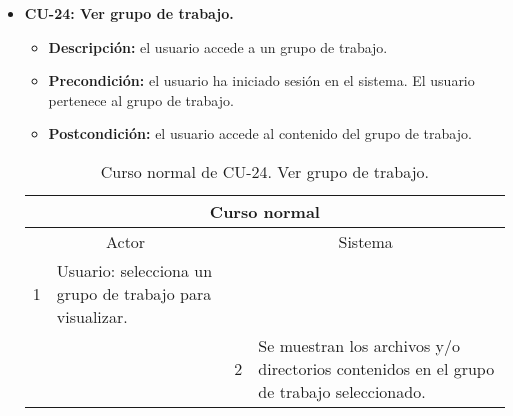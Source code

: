 \begin{itemize}
	\item \textbf{CU-24: Ver grupo de trabajo.}
	\begin{itemize}
		\item \textbf{Descripción:} el usuario accede a un grupo de trabajo.
		\item \textbf{Precondición:} el usuario ha iniciado sesión en el sistema. El usuario pertenece al grupo de trabajo.
		\item \textbf{Postcondición:} el usuario accede al contenido del grupo de trabajo.
	\end{itemize}
	\begin{table}[H]
		\centering
		\begin{tabular}{|p{0.3cm}|p{5cm}|p{0.3cm}|p{5cm}|}
			\hline
			\multicolumn{4}{|c|}{Curso normal} \\ \hline
			\multicolumn{2}{|c|}{Actor} & \multicolumn{2}{|c|}{Sistema} \\ \hline
			1 & Usuario: selecciona un grupo de trabajo para visualizar. &  &  \\ \hline
			&  & 2 & Se muestran los archivos y/o directorios contenidos en el grupo de trabajo seleccionado. \\ \hline
		\end{tabular}
		\caption{Curso normal de CU-24. Ver grupo de trabajo.}
		\label{tabla:cu24-normal}
	\end{table}
\end{itemize}

